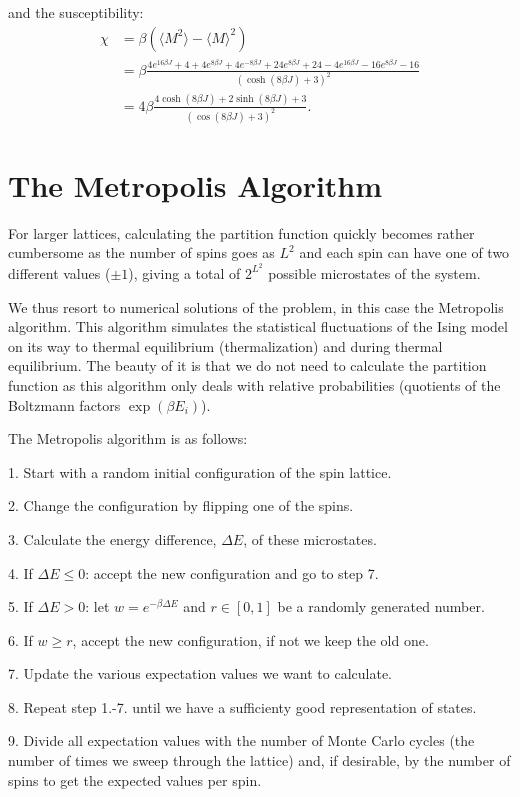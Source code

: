 \documentclass[english, 12pt]{article}
\newcommand{\f}{\frac}
\begin{document}
and the susceptibility:
\begin{align*}
\chi &= \beta(\langle M^2\rangle - \langle M\rangle^2) \\
&= \beta\f{4e^{16\beta J} +4 +4e^{8\beta J} + 4e^{-8\beta J} + 24e^{8\beta J} +24 -4e^{16\beta J} - 16e^{8\beta J}-16}{(\cosh(8\beta J)+3)^2}\\
&= 4\beta \f{4\cosh(8\beta J) + 2\sinh(8\beta J) +3}{(\cos(8\beta J) +3) ^2}.
\end{align*}

\section{The Metropolis Algorithm}
For larger lattices, calculating the partition function quickly becomes rather cumbersome as the number of spins goes as $L^2$ and each spin can have one of two different values ($\pm1$), giving a total of $2^{L^2}$ possible microstates of the system.

We thus resort to numerical solutions of the problem, in this case the Metropolis algorithm. This algorithm simulates the statistical fluctuations of the Ising model on its way to thermal equilibrium (thermalization) and during thermal equilibrium. The beauty of it is that we do not need to calculate the partition function as this algorithm only deals with relative probabilities (quotients of the Boltzmann factors $\exp(\beta E_i)$).

The Metropolis algorithm is as follows:

1. Start with a random initial configuration of the spin lattice.

2. Change the configuration by flipping one of the spins.

3. Calculate the energy difference, $\Delta E$, of these microstates.

4. If $\Delta E\leq 0$: accept the new configuration and go to step 7.

5. If $\Delta E>0$: let $w = e^{-\beta\Delta E}$ and $r\in[0,1]$ be a randomly generated number.

6. If $w\geq r$, accept the new configuration, if not we keep the old one.

7. Update the various expectation values we want to calculate.

8. Repeat step 1.-7. until we have a sufficienty good representation of states.

9. Divide all expectation values with the number of Monte Carlo cycles (the number of times we sweep through the lattice) and, if desirable, by the number of spins to get the expected values per spin.
\end{document}
